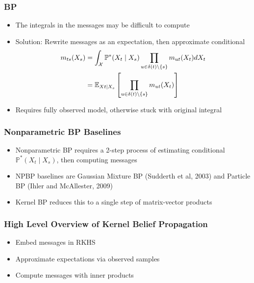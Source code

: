 \documentclass{beamer}
\begin{document}
\begin{frame}
\frametitle{BP}
\begin{itemize}
\item The integrals in the messages may be difficult to compute
\vspace{2em}
\item Solution: Rewrite messages as an expectation, then approximate conditional
\begin{align*}
m_{ts}(X_s) &= \int_{\mathcal{X}} \mathbb{P}^*(X_t \mid X_s)
\prod_{u \in \delta(t)\setminus\left\{s\right\}} m_{ut}(X_t)dX_t\\
&= \mathbb{E}_{Xt \mid X_s}\left[
\prod_{u \in \delta(t)\setminus\left\{s\right\}} m_{ut}(X_t)\right]
\end{align*}
\item Requires fully observed model, otherwise stuck with original integral
\end{itemize}
\end{frame}

\begin{frame}
\frametitle{Nonparametric BP Baselines}
\begin{itemize}
\item Nonparametric BP requires a 2-step process of estimating conditional $\mathbb{P}^*(X_t \mid X_s)$,
    then computing messages
\vspace{2em}
\item NPBP baselines are Gaussian Mixture BP (Sudderth et al, 2003) and 
Particle BP (Ihler and McAllester, 2009)
\vspace{2em}
\item Kernel BP reduces this to a single step of matrix-vector products
\end{itemize}
\end{frame}

\begin{frame}
\frametitle{High Level Overview of Kernel Belief Propagation}
\begin{itemize}
\item Embed messages in RKHS
\vspace{2em}
\item Approximate expectations via observed samples 
\vspace{2em}
\item Compute messages with inner products
\end{itemize}
\end{frame}
\end{document}
